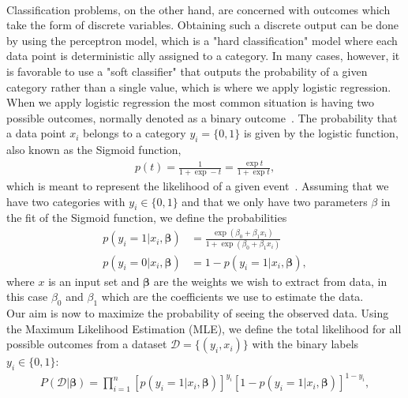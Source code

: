 \documentclass[english,notitlepage,reprint,nofootinbib]{revtex4–2}  %
\begin{document}
\vspace{3mm}
\\
Classification problems, on the other hand, are concerned with outcomes which take the form of discrete variables. 
Obtaining such a discrete output can be done by using the perceptron model, which is a "hard classification" model where each data point is deterministic ally assigned to a category. In many cases, however, it is favorable to use a "soft classifier" that outputs the probability of a given category rather than a single value, which is where we apply logistic regression. 
\vspace{3mm}
\\
When we apply logistic regression the most common situation is having two possible outcomes, normally denoted as a binary outcome~\cite{lecture_notes}. %
The probability that a data point $x_i$ belongs to a category $y_i = \{0,1\}$ is given by the logistic function, also known as the Sigmoid function, 
\begin{align}\label{eq: logistic_function} %
    p(t) = \frac{1}{1+\exp -t} = \frac{\exp t}{1+\exp t}, 
\end{align}
which is meant to represent the likelihood of a given event~\cite{lecture_notes}. 
Assuming that we have two categories with $y_i\in\{0,1\}$ and that we only have two parameters $\beta$ in the fit of the Sigmoid function, we define the probabilities 
\begin{align}
    p(y_i=1 | x_i,\boldsymbol{\beta}) &= 
    \frac{\exp(\beta_0 + \beta_1 x_i)}
    {1 + \exp(\beta_0 + \beta_1 x_i)} \\ 
    p(y_i=0 | x_i,\boldsymbol{\beta}) &= 
    1 - p(y_i=1 | x_i,\boldsymbol{\beta}) , 
\end{align}
where $x$ is an input set and $\boldsymbol{\beta}$ are the weights we wish to extract from data, in this case $\beta_0$ and $\beta_1$ which are the coefficients we use to estimate the data. 
\vspace{3mm}
\\ 
Our aim is now to maximize the probability of seeing the observed data. 
Using the Maximum Likelihood Estimation (MLE), we define the total likelihood for all possible outcomes from a dataset $\mathcal{D} = \{(y_i,x_i)\}$ with the binary labels $y_i\in\{0,1\}$: 
\begin{align}
    P(\mathcal{D}|\boldsymbol{\beta}) 
    = \prod\limits_{i=1}^n 
    [p(y_i=1|x_i,\boldsymbol{\beta})]^{y_i}
    [1 - p(y_i=1|x_i,\boldsymbol{\beta})]^{1-y_i}, 
\end{align}
\end{document}
